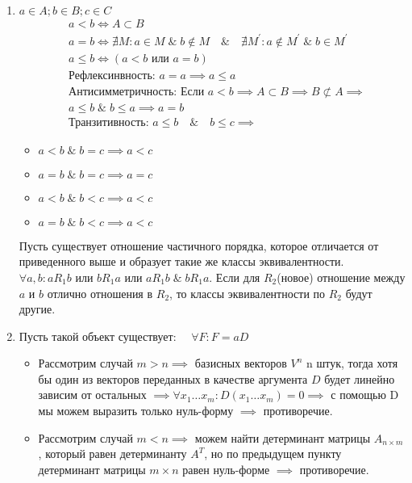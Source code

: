 \documentclass{article}
\begin{document}
\begin{enumerate}
\begin{itemize}
    \end{itemize}
    \item $a \in A; b \in B; c \in C$
    \begin{align*}
        & a < b \Leftrightarrow A \subset B  \\
        & a = b \Leftrightarrow \nexists M: a \in M \; \& \; b \not\in M\quad \& \quad \nexists M^{\prime}: a \not\in M^{\prime}\; \& \; b \in M^{\prime}\\
        & a \leq b \Leftrightarrow (a < b \text{ или } a = b) \\
        & \text{Рефлексинвность: } a = a \implies a \leq a \\
        & \text{Антисимметричность: Если } a < b \implies A \subset B \implies B \not\subset A \implies \\
        & a \leq b \; \& \; b \leq a \implies a = b \\
        & \text{Транзитивность: } a \leq b \quad \& \quad b \leq c \implies 
    \end{align*}
    \begin{itemize}
            \item $a < b \;\&\; b = c \implies a < c$
            \item $a = b \;\&\;b = c \implies a = c$
            \item $a < b \;\&\; b < c \implies a < c$
            \item $a = b \;\&\;b < c \implies a < c$
        \end{itemize}
    Пусть существует отношение частичного порядка, которое отличается от приведенного выше и образует такие же классы эквивалентности. \\
    $\forall a, b: aR_1b$ или $bR_1a$ или $aR_1b \; \& \; bR_1a$. Если для $R_2$(новое) отношение между $a$ и $b$ отлично отношения в $R_2$, то классы эквивалентности по $R_2$ будут другие.

    
    \item
    Пусть такой объект существует: $\quad \forall F: F = aD$
        \begin{itemize}
            \item Рассмотрим случай $m > n \implies$ базисных векторов $V^{n}$ n штук, тогда хотя бы один из векторов 
            переданных в качестве аргумента $D$ будет линейно зависим от остальных $\implies \forall x_1\dots x_m: D(x_1 \dots x_m) = 0 \implies$ 
            с помощью D мы можем выразить только нуль-форму $\implies$ противоречие. 
            \item Рассмотрим случай $m < n \implies$ можем найти детерминант матрицы $A_{n \times m}$, который равен детерминанту $A^{T}$, но по предыдущем пункту
            детерминант матрицы  $m \times n$ равен нуль-форме $\implies$ противоречие.


\end{itemize}
\end{enumerate}
\end{document}
